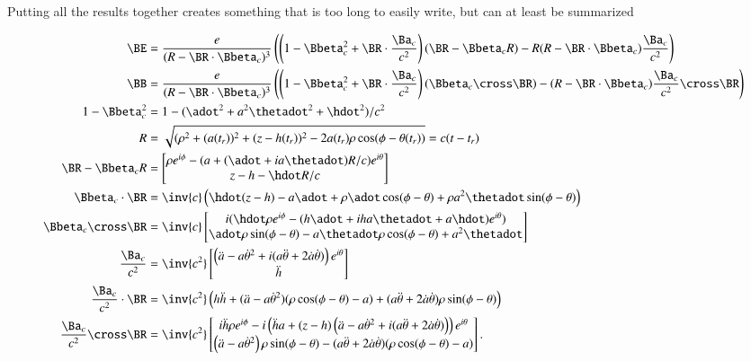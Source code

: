 {Putting all the results together creates something that is too long to easily write, but can at least be summarized

\begin{equation}\label{eqn:relativisticElectrodynamicsExamReflection:990}
\begin{aligned}
\BE
&=
\frac{e}{(R - \BR \cdot \Bbeta_c)^3}\left(
\left(1 - \Bbeta_c^2 + \BR \cdot \frac{\Ba_c}{c^2}
\right) (\BR - \Bbeta_c R)
- R(R - \BR \cdot \Bbeta_c) \frac{\Ba_c}{c^2}
\right) \\
\BB
&=
\frac{e}{(R - \BR \cdot \Bbeta_c)^3}\left(
\left(1 - \Bbeta_c^2 + \BR \cdot \frac{\Ba_c}{c^2}
\right) (\Bbeta_c \cross \BR)
- (R - \BR \cdot \Bbeta_c) \frac{\Ba_c}{c^2} \cross \BR
\right) \\
1 - \Bbeta_c^2 &= 1 - (\adot^2 + a^2 \thetadot^2 + \hdot^2)/c^2 \\
R &= \sqrt{(\rho^2 + (a(t_r))^2 + (z-h(t_r))^2 - 2 a(t_r) \rho \cos(\phi - \theta(t_r))} = c( t - t_r) \\
\BR - \Bbeta_c R &=
\begin{bmatrix}
\rho e^{i\phi} - (a + (\adot + i a\thetadot) R/c) e^{i\theta} \\
z - h - \hdot R/c
\end{bmatrix} \\
\Bbeta_c \cdot \BR &= \inv{c}\left( \hdot (z - h) -a \adot + \rho \adot \cos(\phi- \theta) + \rho a^2 \thetadot \sin(\phi - \theta) \right) \\
\Bbeta_c \cross \BR
&=
\inv{c}
\begin{bmatrix}
i( \hdot \rho e^{i\phi} - (h \adot + i h a \thetadot + a \hdot) e^{i\theta} ) \\
\adot \rho \sin(\phi - \theta) - a \thetadot \rho \cos(\phi - \theta) + a^2 \thetadot
\end{bmatrix} \\
\frac{\Ba_c}{c^2} &=
\inv{c^2}
\begin{bmatrix}
\left( \ddot{a} - a {\dot{\theta}}^2 + i ( a\ddot{\theta} + 2 \dot{a} \dot{\theta} ) \right) e^{i\theta} \\
\ddot{h}
\end{bmatrix} \\
\frac{\Ba_c}{c^2} \cdot \BR &=
\inv{c^2} \left(
h \ddot{h} +
( \ddot{a} - a {\dot{\theta}}^2 ) (\rho \cos(\phi - \theta) - a)
+ (a \ddot{\theta} + 2 \dot{a} \dot{\theta}) \rho \sin(\phi - \theta) \right) \\
\frac{\Ba_c}{c^2} \cross \BR
&=
\inv{c^2}
\begin{bmatrix}
i \ddot{h} \rho e^{i\phi}
- i \left( \ddot{h} a + (z - h) \left( \ddot{a} - a {\dot{\theta}}^2 + i ( a\ddot{\theta} + 2 \dot{a} \dot{\theta} ) \right) \right) e^{i\theta} \\
\left( \ddot{a} - a {\dot{\theta}}^2 \right) \rho \sin(\phi - \theta)
-( a\ddot{\theta} + 2 \dot{a} \dot{\theta} ) (\rho \cos(\phi -\theta) - a)
\end{bmatrix}.
\end{aligned}
\end{equation}

}
